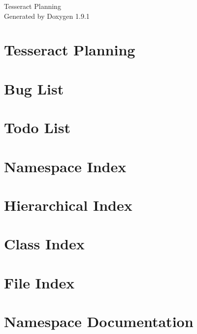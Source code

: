 \let\mypdfximage\pdfximage\def\pdfximage{\immediate\mypdfximage}\documentclass[twoside]{book}
\newcommand{\+}{\discretionary{\mbox{\scriptsize$\hookleftarrow$}}{}{}}
\newcommand{\clearemptydoublepage}{%
  \newpage{\pagestyle{empty}\cleardoublepage}%
}
\begin{document}
\raggedbottom

\hypersetup{pageanchor=false,
             bookmarksnumbered=true,
             pdfencoding=unicode
            }
\begin{titlepage}
\vspace*{7cm}
\begin{center}%
{\Large Tesseract Planning }\\
\vspace*{1cm}
{\large Generated by Doxygen 1.9.1}\\
\end{center}
\end{titlepage}
\clearemptydoublepage
{}
\tableofcontents
\clearemptydoublepage
{}
\hypersetup{pageanchor=true}

\chapter{Tesseract Planning}
\label{index}\hypertarget{index}{}
\chapter{Bug List}
\label{bug}

\chapter{Todo List}
\label{todo}

\chapter{Namespace Index}

\chapter{Hierarchical Index}

\chapter{Class Index}

\chapter{File Index}

\chapter{Namespace Documentation}











\end{document}
